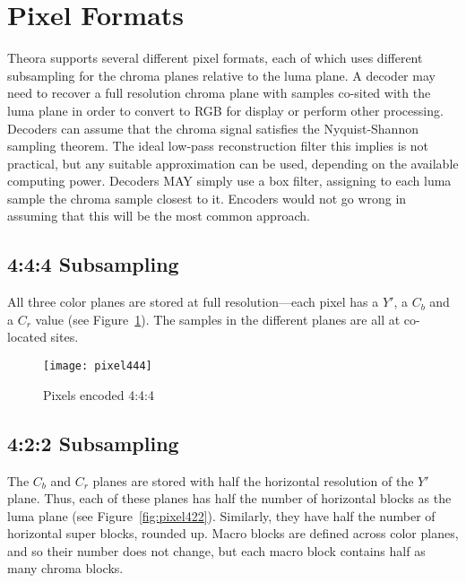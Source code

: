 \documentclass[9pt,letterpaper]{book}
\numberwithin{equation}{chapter}
\numberwithin{figure}{chapter}
\numberwithin{table}{chapter}
\begin{document}
\section{Pixel Formats}
\label{sec:pixfmts}

Theora supports several different pixel formats, each of which uses different
 subsampling for the chroma planes relative to the luma plane.
A decoder may need to recover a full resolution chroma plane with samples
 co-sited with the luma plane in order to convert to RGB for display or perform
 other processing.
Decoders can assume that the chroma signal satisfies the Nyquist-Shannon
 sampling theorem.
The ideal low-pass reconstruction filter this implies is not practical, but any
 suitable approximation can be used, depending on the available computing
 power.
Decoders MAY simply use a box filter, assigning to each luma sample the chroma
 sample closest to it.
Encoders would not go wrong in assuming that this will be the most common
 approach.

\subsection{4:4:4 Subsampling}
\label{sec:444}

All three color planes are stored at full resolution---each pixel has a $Y'$,
 a $C_b$ and a $C_r$ value (see Figure~\ref{fig:pixel444}).
The samples in the different planes are all at co-located sites.

\begin{figure}[htbp]
\begin{center}
\texttt{[image: pixel444]}
\end{center}
\caption{Pixels encoded 4:4:4}
\label{fig:pixel444}
\end{figure}

%
%
%
%
%
%


\subsection{4:2:2 Subsampling}
\label{sec:422}

The $C_b$ and $C_r$ planes are stored with half the horizontal resolution of
 the $Y'$ plane.
Thus, each of these planes has half the number of horizontal blocks as the luma
 plane (see Figure~\ref{fig:pixel422}).
Similarly, they have half the number of horizontal super blocks, rounded up.
Macro blocks are defined across color planes, and so their number does not
 change, but each macro block contains half as many chroma blocks.
\end{document}
